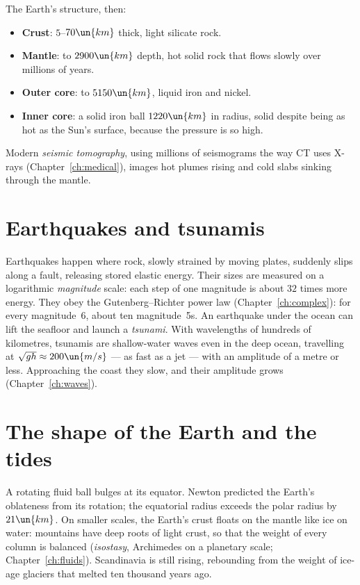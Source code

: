 The Earth's structure, then:
\begin{itemize}[itemsep=2pt]
  \item \textbf{Crust}: $5$--$70\un{km}$ thick, light silicate rock.
  \item \textbf{Mantle}: to $2900\un{km}$ depth, hot solid rock that flows slowly over millions of years.
  \item \textbf{Outer core}: to $5150\un{km}$, liquid iron and nickel.
  \item \textbf{Inner core}: a solid iron ball $1220\un{km}$ in radius, solid despite being as hot as the Sun's surface, because the pressure is so high.
\end{itemize}
Modern \emph{seismic tomography}, using millions of seismograms the way CT uses X-rays (Chapter~\ref{ch:medical}), images hot plumes rising and cold slabs sinking through the mantle.

\section{Earthquakes and tsunamis}

Earthquakes happen where rock, slowly strained by moving plates, suddenly slips along a fault, releasing stored elastic energy. Their sizes are measured on a logarithmic \emph{magnitude} scale: each step of one magnitude is about $32$ times more energy. They obey the Gutenberg--Richter power law (Chapter~\ref{ch:complex}): for every magnitude~6, about ten magnitude~5s. An earthquake under the ocean can lift the seafloor and launch a \emph{tsunami}. With wavelengths of hundreds of kilometres, tsunamis are shallow-water waves even in the deep ocean, travelling at $\sqrt{gh}\approx200\un{m/s}$ --- as fast as a jet --- with an amplitude of a metre or less. Approaching the coast they slow, and their amplitude grows (Chapter~\ref{ch:waves}).

\section{The shape of the Earth and the tides}

A rotating fluid ball bulges at its equator. Newton predicted the Earth's oblateness from its rotation; the equatorial radius exceeds the polar radius by $21\un{km}$. On smaller scales, the Earth's crust floats on the mantle like ice on water: mountains have deep roots of light crust, so that the weight of every column is balanced (\emph{isostasy}, Archimedes on a planetary scale; Chapter~\ref{ch:fluids}). Scandinavia is still rising, rebounding from the weight of ice-age glaciers that melted ten thousand years ago.

